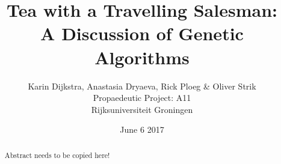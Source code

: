 \documentclass[11pt,a4paper]{report}
\title{Tea with a Travelling Salesman:\\
	\large A Discussion of Genetic Algorithms}
\author{Karin Dijkstra, Anastasia Dryaeva, Rick Ploeg \& Oliver Strik\\
Propaedeutic Project: A11\\
Rijksuniversiteit Groningen}
\date{June 6 2017}
\begin{document}
\maketitle

\begin{abstract}
Abstract needs to be copied here!
\end{abstract}

\tableofcontents

%
%
%

%
%
%
\end{document}
